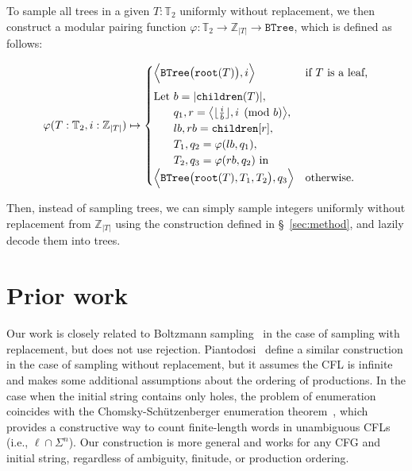 \documentclass[sigplan,nonacm,anonymous]{acmart}\settopmatter{printfolios=false,printccs=false,printacmref=false}
\begin{document}
To sample all trees in a given $T: \mathbb{T}_2$ uniformly without replacement, we then construct a modular pairing function $\varphi: \mathbb{T}_2 \rightarrow \mathbb{Z}_{|T|} \rightarrow \texttt{BTree}$, which is defined as follows:

\begin{small}
\begin{equation*}
  \varphi(T: \mathbb{T}_2, i: \mathbb{Z}_{|T|}) \mapsto \begin{cases}
  \Big\langle\texttt{BTree}\big(\texttt{root}(T)\big), i\Big\rangle & \text{if $T$ is a leaf,} \vspace{5pt}\\
  \text{Let } b = |\texttt{children}(T)|,\\
  \phantom{\text{Let }} q_1, r=\big\langle\lfloor\frac{i}{b}\rfloor, i \pmod{b}\big\rangle,\\
  \phantom{\text{Let }} lb, rb = \texttt{children}[r],\\
  \phantom{\text{Let }} T_1, q_2 = \varphi(lb, q_1),\\
  \phantom{\text{Let }} T_2, q_3 = \varphi(rb, q_2) \text{ in } \\
  \Big\langle\texttt{BTree}\big(\texttt{root}(T), T_1, T_2\big), q_3\Big\rangle & \text{otherwise.} \\
  \end{cases}
\end{equation*}
\end{small}

Then, instead of sampling trees, we can simply sample integers uniformly without replacement from $\mathbb{Z}_{|T|}$ using the construction defined in \S~\ref{sec:method}, and lazily decode them into trees.

  \section{Prior work}

  Our work is closely related to Boltzmann sampling~\cite{duchon2004boltzmann} in the case of sampling with replacement, but does not use rejection. Piantodosi~\cite{piantadosi2023enumerate} define a similar construction in the case of sampling without replacement, but it assumes the CFL is infinite and makes some additional assumptions about the ordering of productions. In the case when the initial string contains only holes, the problem of enumeration coincides with the Chomsky-Sch\"utzenberger enumeration theorem~\cite{panholzer2005grobner}, which provides a constructive way to count finite-length words in unambiguous CFLs (i.e., $\ell\cap\Sigma^n$). Our construction is more general and works for any CFG and initial string, regardless of ambiguity, finitude, or production ordering. %
\end{document}
